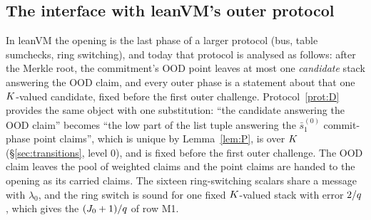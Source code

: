 \subsection{The interface with leanVM's outer protocol}\label{sec:interface}

In leanVM the opening is the last phase of a larger protocol (bus, table sumchecks, ring switching), and today that protocol is analysed as follows: after the Merkle root, the commitment's OOD point leaves at most one \emph{candidate} stack answering the OOD claim, and every outer phase is a statement about that one $K$-valued candidate, fixed before the first outer challenge. Protocol~\ref{prot:D} provides the same object with one substitution: ``the candidate answering the OOD claim'' becomes ``the low part of the list tuple answering the $\bar s^{(0)}_1$ commit-phase point claims'', which is unique by Lemma~\ref{lem:P}, is over $K$ (\S\ref{sec:transitions}, level $0$), and is fixed before the first outer challenge. The OOD claim leaves the pool of weighted claims and the point claims are handed to the opening as its carried claims. The sixteen ring-switching scalars share a message with $\lambda_0$, and the ring switch is sound for one fixed $K$-valued stack with error $2/q$, which gives the $(J_0+1)/q$ of row M1.

